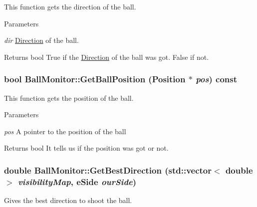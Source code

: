 This function gets the direction of the ball. 


\begin{DoxyParams}{Parameters}
\item[{\em dir}]\hyperlink{structBallMonitor_1_1Direction}{Direction} of the ball. \end{DoxyParams}
\begin{DoxyReturn}{Returns}
bool True if the \hyperlink{structBallMonitor_1_1Direction}{Direction} of the ball was got. False if not. 
\end{DoxyReturn}
\hypertarget{classBallMonitor_aab81815271c442087c15bc8f6843d092}{
\subsubsection[{GetBallPosition}]{\setlength{\rightskip}{0pt plus 5cm}bool BallMonitor::GetBallPosition (Position $\ast$ {\em pos}) const}}
\label{classBallMonitor_aab81815271c442087c15bc8f6843d092}


This function gets the position of the ball. 


\begin{DoxyParams}{Parameters}
\item[{\em pos}]A pointer to the position of the ball \end{DoxyParams}
\begin{DoxyReturn}{Returns}
bool It tells us if the position was got or not. 
\end{DoxyReturn}
\hypertarget{classBallMonitor_a9045d5d3abf9c9b549303c831b3387e0}{
\subsubsection[{GetBestDirection}]{\setlength{\rightskip}{0pt plus 5cm}double BallMonitor::GetBestDirection (std::vector$<$ double $>$ {\em visibilityMap}, \/  eSide {\em ourSide})}}
\label{classBallMonitor_a9045d5d3abf9c9b549303c831b3387e0}


Gives the best direction to shoot the ball. 


